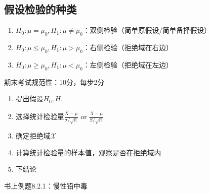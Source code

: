 \subsection{假设检验的种类}%
\label{sub:假设检验的种类}
\begin{enumerate}
    \item $H_0:\mu=\mu_0,H_1:\mu\neq \mu_0$：双侧检验（简单原假设/简单备择假设）
    \item $H_0:\mu\le \mu_0,H_1:\mu>\mu_0$：右侧检验（拒绝域在右边）
    \item $H_0:\mu\ge \mu_0,H_1:\mu<\mu_0$：左侧检验（拒绝域在左边）
\end{enumerate}
\begin{notation}
    期末考试规范性：10分，每步2分
    \begin{enumerate}
        \item 提出假设$H_0,H_1$
        \item 选择统计检验量$\frac{\overline{X}-\mu}{\sigma /\sqrt{n}} \text{ or } \frac{\overline{X}-\mu}{S /\sqrt{n}}$
        \item 确定拒绝域$\mathscr{X}$
        \item 计算统计检验量的样本值，观察是否在拒绝域内
        \item 下结论
    \end{enumerate}
\end{notation}
\begin{eg}
书上例题8.2.1：慢性铅中毒
\end{eg}

